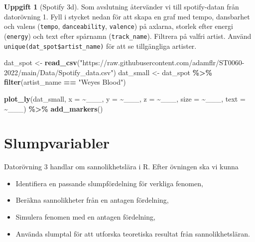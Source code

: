 \documentclass[
]{book}
\newenvironment{Shaded}{\begin{snugshade}}{\end{snugshade}}
\newcommand{\AttributeTok}[1]{\textcolor[rgb]{0.13,0.29,0.53}{#1}}
\newcommand{\FunctionTok}[1]{\textcolor[rgb]{0.13,0.29,0.53}{\textbf{#1}}}
\newcommand{\NormalTok}[1]{#1}
\newcommand{\OtherTok}[1]{\textcolor[rgb]{0.56,0.35,0.01}{#1}}
\newcommand{\SpecialCharTok}[1]{\textcolor[rgb]{0.81,0.36,0.00}{\textbf{#1}}}
\newcommand{\StringTok}[1]{\textcolor[rgb]{0.31,0.60,0.02}{#1}}
\theoremstyle{definition}
\theoremstyle{definition}
\theoremstyle{definition}
\newtheorem{exercise}{Uppgift}[chapter]
\theoremstyle{definition}
\theoremstyle{remark}
\begin{document}
\begin{exercise}[Spotify 3d]

Som avslutning återvänder vi till spotify-datan från datorövning 1. Fyll i stycket nedan för att skapa en graf med tempo, dansbarhet och valens (\texttt{tempo}, \texttt{danceability}, \texttt{valence}) på axlarna, storlek efter energi (\texttt{energy}) och text efter spårnamn (\texttt{track\_name}). Filtrera på valfri artist. Använd \texttt{unique(dat\_spot\$artist\_name)} för att se tillgängliga artister.

\begin{Shaded}
\begin{Highlighting}[]
\NormalTok{dat\_spot }\OtherTok{\textless{}{-}} \FunctionTok{read\_csv}\NormalTok{(}\StringTok{"https://raw.githubusercontent.com/adamflr/ST0060{-}2022/main/Data/Spotify\_data.csv"}\NormalTok{)}
\NormalTok{dat\_small }\OtherTok{\textless{}{-}}\NormalTok{ dat\_spot }\SpecialCharTok{\%\textgreater{}\%} \FunctionTok{filter}\NormalTok{(artist\_name }\SpecialCharTok{==} \StringTok{"Weyes Blood"}\NormalTok{)}

\FunctionTok{plot\_ly}\NormalTok{(dat\_small, }\AttributeTok{x =} \SpecialCharTok{\textasciitilde{}}\NormalTok{\_\_\_, }\AttributeTok{y =} \SpecialCharTok{\textasciitilde{}}\NormalTok{\_\_\_, }\AttributeTok{z =} \SpecialCharTok{\textasciitilde{}}\NormalTok{\_\_\_, }\AttributeTok{size =} \SpecialCharTok{\textasciitilde{}}\NormalTok{\_\_\_, }\AttributeTok{text =} \SpecialCharTok{\textasciitilde{}}\NormalTok{\_\_\_) }\SpecialCharTok{\%\textgreater{}\%} 
  \FunctionTok{add\_markers}\NormalTok{()}
\end{Highlighting}
\end{Shaded}

\end{exercise}

\hypertarget{slumpvariabler}{%
\chapter{Slumpvariabler}\label{slumpvariabler}}

Datorövning 3 handlar om sannolikhetslära i R. Efter övningen ska vi kunna

\begin{itemize}
\item
  Identifiera en passande slumpfördelning för verkliga fenomen,
\item
  Beräkna sannolikheter från en antagen fördelning,
\item
  Simulera fenomen med en antagen fördelning,
\item
  Använda slumptal för att utforska teoretiska resultat från sannolikhetsläran.
\end{itemize}
\end{document}
